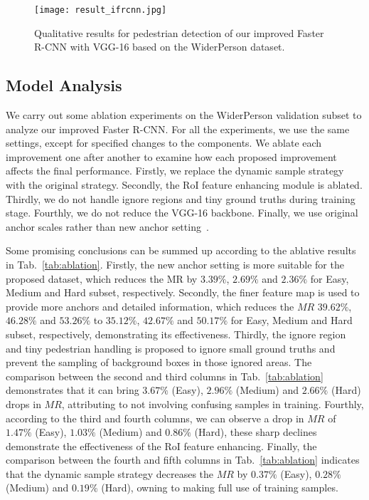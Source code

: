 \documentclass[journal]{IEEEtran}
\begin{document}
\begin{figure*}[t]
\centering
\texttt{[image: result\_ifrcnn.jpg]}
\caption{Qualitative results for pedestrian detection of our improved Faster R-CNN with VGG-16 based on the WiderPerson dataset.}
\label{fig:result_frcnn}
\end{figure*}

\subsection{Model Analysis}
We carry out some ablation experiments on the WiderPerson validation subset to analyze our improved Faster R-CNN. For all the experiments, we use the same settings, except for specified changes to the components. We ablate each improvement one after another to examine how each proposed improvement affects the final performance. Firstly, we replace the dynamic sample strategy with the original strategy. Secondly, the RoI feature enhancing module is ablated. Thirdly, we do not handle ignore regions and tiny ground truths during training stage. Fourthly, we do not reduce the VGG-16 backbone. Finally, we use original anchor scales rather than new anchor setting~\cite{DBLP:conf/cvpr/ZhangBS17}.

Some promising conclusions can be summed up according to the ablative results in Tab.~\ref{tab:ablation}. Firstly, the new anchor setting is more suitable for the proposed dataset, which reduces the MR by $3.39\%$, $2.69\%$ and $2.36\%$ for Easy, Medium and Hard subset, respectively. Secondly, the finer feature map is used to provide more anchors and detailed information, which reduces the $MR$ $39.62\%$, $46.28\%$ and $53.26\%$ to $35.12\%$, $42.67\%$ and $50.17\%$ for Easy, Medium and Hard subset, respectively, demonstrating its effectiveness. Thirdly, the ignore region and tiny pedestrian handling is proposed to ignore small ground truths and prevent the sampling of background boxes in those ignored areas. The comparison between the second and third columns in Tab.~\ref{tab:ablation} demonstrates that it can bring $3.67\%$ (Easy), $2.96\%$ (Medium) and $2.66\%$ (Hard) drops in $MR$, attributing to not involving confusing samples in training. Fourthly, according to the third and fourth columns, we can observe a drop in $MR$ of $1.47\%$ (Easy), $1.03\%$ (Medium) and $0.86\%$ (Hard), these sharp declines demonstrate the effectiveness of the RoI feature enhancing. Finally, the comparison between the fourth and fifth columns in Tab.~\ref{tab:ablation} indicates that the dynamic sample strategy decreases the $MR$ by $0.37\%$ (Easy), $0.28\%$ (Medium) and $0.19\%$ (Hard), owning to making full use of training samples.
\end{document}
